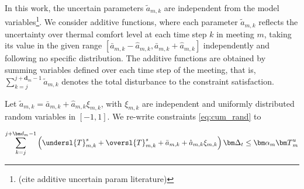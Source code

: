 \noindent In this work, the uncertain parameters $\tilde{a}_{m,k}$ are independent from the model variables\footnote{(cite additive uncertain param literature)}. We consider additive functions, where each parameter $\tilde{a}_{m,k}$ reflects the uncertainty over thermal comfort level at each time step $k$ in meeting $m$, taking its value in the given range $\left[\bar{a}_{m,k}-\hat{a}_{m,k}, \bar{a}_{m,k}+\hat{a}_{m,k}\right]$ independently and following no specific distribution. The additive functions are obtained by summing variables defined over each time step of the meeting, that is, $\sum\limits_{k=j}^{j+{\bm d}_m -1}{\tilde{a}_{m,k}}$ denotes the total disturbance to the constraint satisfaction.

Let $\tilde{a}_{m,k} = \bar{a}_{m,k} + \hat{a}_{m,k} \xi_{m,k}$, with $\xi_{m,k}$ are independent and uniformly distributed random variables in $\left[-1, 1\right]$. We re-write constraints \eqref{eq:cum_rand} to 

\begin{equation}
\sum\limits_{k=j}^{j+{\bm d}_m -1}\left(\undersl{T}^{s}_{m,k}   +  \oversl{T}^{s}_{m,k} + \bar{a}_{m,k} + \hat{a}_{m,k} \xi_{m,k}  \right) {\bm \Delta_t} \leq {\bm \alpha}_m {\bm T}^u_m \label{eq:cum_rand_expand}
\end{equation}

